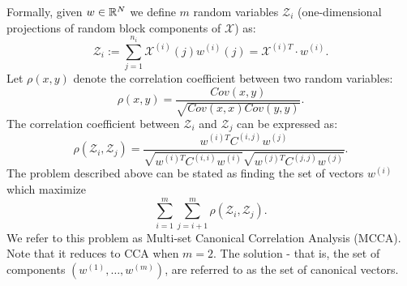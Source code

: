Formally, given $w \in \mathbb{R}^N$ we define $m$ random variables $\mathcal{Z}_i$ (one-dimensional projections of random block components of $\mathcal{X}$) as:
\begin{equation*}
\mathcal{Z}_i := \sum_{j = 1}^{n_i} \mathcal{X}^{(i)}\left(j\right)
w^{(i)}\left(j\right) = \mathcal{X}^{(i)T} \cdot w^{(i)}.
\end{equation*}
%
Let $\rho\left(x,y\right)$ denote the correlation
 coefficient between two random variables:
\begin{equation*}
\rho\left(x,y\right) =
 \frac{Cov\left(x,y\right)}{\sqrt{Cov\left(x,x\right) Cov\left(y,y\right)}}.
\end{equation*}
 The correlation coefficient between $\mathcal{Z}_i$ and
 $\mathcal{Z}_j$ can be expressed as:
\begin{equation*}
\rho\left(\mathcal{Z}_i, \mathcal{Z}_j\right) = \frac{w^{(i)T} C^{(i,j)}
   w^{(j)}}{\sqrt{w^{(i)T} C^{(i,i)} w^{(i)}}\sqrt{w^{(j)T}
     C^{(j,j)} w^{(j)}} }.
\end{equation*}
%
%
The problem described above can be stated as
finding the set of vectors $w^{(i)}$
which maximize
\begin{equation}\label{eq:SUMCOR}
\tag{SUMCOR}
\sum_{i = 1}^m \sum_{j = i+1}^m
\rho\left(\mathcal{Z}_i, \mathcal{Z}_j\right).
\end{equation}
We refer to this problem as Multi-set Canonical
Correlation Analysis (MCCA). Note that it reduces to CCA when
$m=2$. The solution - that is, the set of components $\left(w^{(1)}, \ldots, w^{(m)}\right)$, are referred to as the set of canonical vectors.%
%

